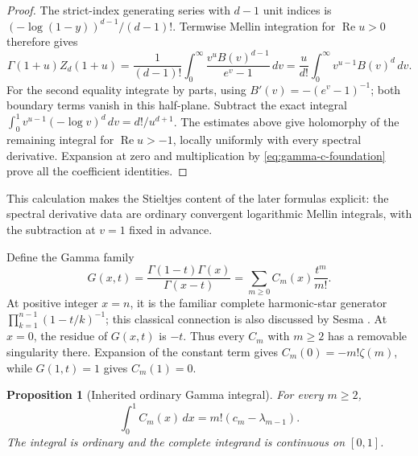 \documentclass[11pt,a4paper]{article}
\numberwithin{equation}{section}
\theoremstyle{plain}
\newtheorem{proposition}[theorem]{Proposition}
\theoremstyle{definition}
\theoremstyle{remark}
\newcommand{\re}{\operatorname{Re}}
\begin{document}
\begin{proof}
The strict-index generating series with $d-1$ unit indices is
$(-\log(1-y))^{d-1}/(d-1)!$. Termwise Mellin integration for
$\re u>0$ therefore gives
\[
 \Gamma(1+u)Z_d(1+u)
  =\frac1{(d-1)!}\int_0^\infty
            \frac{v^u B(v)^{d-1}}{e^v-1}\,dv
  =\frac{u}{d!}\int_0^\infty v^{u-1}B(v)^d\,dv.
\]
For the second equality integrate by parts, using
$B'(v)=-(e^v-1)^{-1}$; both boundary terms vanish in this half-plane.
Subtract the exact integral
$\int_0^1v^{u-1}(-\log v)^d\,dv=d!/u^{d+1}$.
The estimates above give holomorphy of the remaining integral for
$\re u>-1$, locally uniformly with every spectral derivative.
Expansion at zero and multiplication by \eqref{eq:gamma-c-foundation}
prove all the coefficient identities.
\end{proof}

This calculation makes the Stieltjes content of the later formulas
explicit: the spectral derivative data are ordinary convergent logarithmic
Mellin integrals, with the subtraction at $v=1$ fixed in advance.

Define the Gamma family
\begin{equation}\label{eq:Cgamma-foundation}
 G(x,t)=\frac{\Gamma(1-t)\Gamma(x)}{\Gamma(x-t)}
       =\sum_{m\ge0}C_m(x)\frac{t^m}{m!}.
\end{equation}
At positive integer $x=n$, it is the familiar complete harmonic-star
generator $\prod_{k=1}^{n-1}(1-t/k)^{-1}$; this classical connection
is also discussed by Sesma \cite{Sesma}. At $x=0$, the residue of
$G(x,t)$ is $-t$. Thus every $C_m$ with $m\ge2$ has a removable
singularity there. Expansion of the constant term gives
$C_m(0)=-m!\zeta(m)$, while $G(1,t)=1$ gives $C_m(1)=0$.

\begin{proposition}[Inherited ordinary Gamma integral]
\label{prop:Cgamma-integral-foundation}
For every $m\ge2$,
\begin{equation}\label{eq:Cgamma-integral-foundation}
 \int_0^1C_m(x)\,dx=m!(c_m-\lambda_{m-1}).
\end{equation}
The integral is ordinary and the complete integrand is continuous on
$[0,1]$.
\end{proposition}
\end{document}
